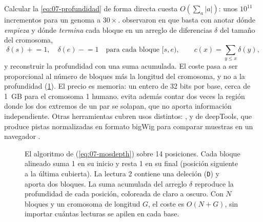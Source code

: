 \begin{simbolos}
\simbolo{$[s,e)$}{Bloque semiabierto de posiciones de referencia cubierto sin interrupción; una deleción o un intrón parten un alineamiento en varios bloques.}
\end{simbolos}

Calcular la \cref{eq:07-profundidad} de forma directa cuesta $O(\sum_a |a|)$: unos $10^{11}$ incrementos para un genoma a $30\times$. \textcite{c07-pedersen2018} observaron en  que basta con anotar dónde \emph{empieza} y dónde \emph{termina} cada bloque en un arreglo de diferencias $\delta$ del tamaño del cromosoma,
\begin{equation}\label{eq:07-mosdepth}
\delta(s) \mathrel{+}= 1,\quad \delta(e) \mathrel{-}= 1 \quad\text{para cada bloque }[s,e),\qquad
c(x) = \sum_{y\le x}\delta(y),
\end{equation}
y reconstruir la profundidad con una suma acumulada. El coste pasa a ser proporcional al número de bloques más la longitud del cromosoma, y no a la profundidad (\cref{fig:07-mosdepth}). El precio es memoria: un entero de 32 bits por base, cerca de 1~GB para el cromosoma 1 humano.  evita además contar dos veces la región donde los dos extremos de un par se solapan, que no aporta información independiente. Otras herramientas cubren usos distintos: ,  \parencite{c07-quinlan2010} y  de deepTools, que produce pistas normalizadas en formato bigWig para comparar muestras en un navegador \parencite{c07-ramirez2016}.

\begin{figure}[tbp]
\centering

\caption[El algoritmo de ]{El algoritmo de  (\cref{eq:07-mosdepth}) sobre 14 posiciones. Cada bloque alineado suma 1 en su inicio y resta 1 en su final (posición siguiente a la última cubierta). La lectura 2 contiene una deleción (\texttt{D}) y aporta dos bloques. La suma acumulada del arreglo $\delta$ reproduce la profundidad de cada posición, coloreada de claro a oscuro. Con $N$ bloques y un cromosoma de longitud $G$, el coste es $O(N+G)$, sin importar cuántas lecturas se apilen en cada base.}
\label{fig:07-mosdepth}
\end{figure}

